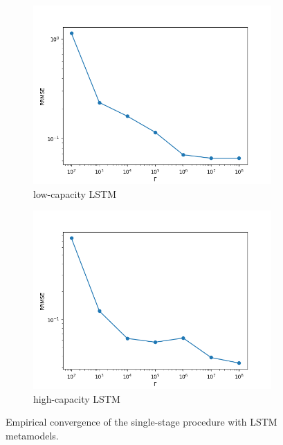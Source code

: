 \documentclass{article}
\begin{document}
\begin{figure}[ht!]
    \centering
    \begin{subfigure}{0.48\textwidth}
        \includegraphics[width=\textwidth]{./figures/singleStage/MSEConvergence_lstmLoCap.png}
        \caption{low-capacity LSTM}
        \label{subfig:convLoCap}
    \end{subfigure}
    \begin{subfigure}{0.48\textwidth}
        \includegraphics[width=\textwidth]{./figures/singleStage/MSEConvergence_lstmHiCap.png}
        \caption{high-capacity LSTM}
        \label{subfig:convHiCap}
    \end{subfigure}
    \caption{Empirical convergence of the single-stage procedure with LSTM metamodels.} 
    \label{fig:gammaConvergence}
\end{figure}
\end{document}
